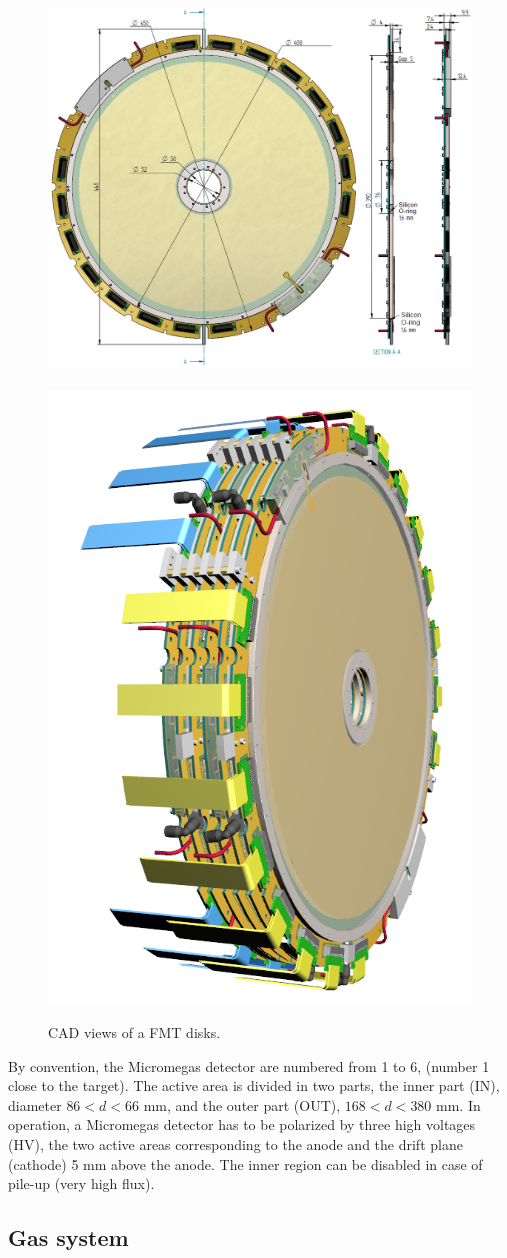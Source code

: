 \begin{figure}[htb]
 \includegraphics[width=0.66\columnwidth,keepaspectratio]{images/fig6_1}~\includegraphics[width=0.33\columnwidth,keepaspectratio]{images/fig6_2}
 \caption{CAD views of a FMT disks.}
 \label{fig:mm-fig5}
\end{figure}

By convention, the Micromegas detector are numbered from 1 to 6, (number 1 close to the target). The active area is divided in two parts, the inner part (IN),  diameter  $86 < d < 66$ mm, and the outer part (OUT), $168 < d < 380$ mm. In operation, a Micromegas detector has to be polarized by three high voltages (HV), the two active areas corresponding to the anode and the drift plane (cathode) 5 mm above the anode. The inner region can be disabled in case of pile-up (very high flux).


\subsection{Gas system}


